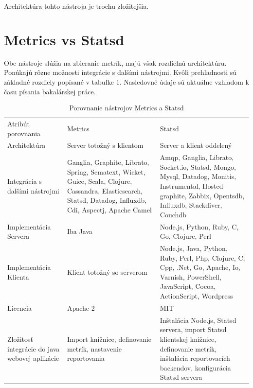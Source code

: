 \documentclass[a4paper, upjsfrontpage, thesismargins, thesislinespacing]{rnthesis}
\begin{document}
Architektúra tohto nástroja je trochu zložitejšia.


\section{Metrics vs Statsd}

Obe nástroje slúžia na zbieranie metrík, majú však rozdielnú architektúru. 
Ponúkajú rôzne možnosti integrácie s ďalšími nástrojmi. 
Kvôli prehľadnosti sú základné rozdiely popísané v tabuľke 1.
Nasledovné údaje sú aktuálne vzhľadom k času písania bakalárskej práce.

\begin{table}
	\caption{Porovnanie nástrojov Metrics a Statsd}
	\centering
	\begin{tabular}{| p{3.7cm} | p{4.5cm} | p{4.7cm} |}
		\hline\noalign{\smallskip}
		Atribút porovnania & Metrics & Statsd \\
		\noalign{\smallskip}
		\hline
		Architektúra & Server totožný s klientom & Server a klient oddelený \\ \hline

		Integrácia s ďalšími nástrojmi & Ganglia, Graphite, Librato, Spring, Sematext, Wicket, Guice, Scala, Clojure, Cassandra, 	Elasticsearch, Statsd, Datadog, Influxdb, Cdi, Aspectj, Apache Camel & Amqp, Ganglia, Librato, Socket.io, Statsd, Mongo, Mysql, Datadog, Monitis, Instrumental, Hosted graphite, Zabbix, Opentsdb, Influxdb, Stackdiver, Couchdb \\ \hline

		Implementácia Servera & Iba Java & Node.js, Python, Ruby, C, Go, Clojure, 	Perl \\ \hline

		Implementácia Klienta & Klient totožný so serverom & Node.js, Java, Python, Ruby, Perl, Php, Clojure, C, Cpp, .Net, Go, 	Apache, Io, Varnish, PowerShell, JavaScript, Cocoa, ActionScript, Wordpress \\ \hline

		Licencia & Apache 2 & MIT \\ \hline

		Zložitosť integrácie do java webovej aplikácie & Import knižnice, definovanie metrík, nastavenie reportovania & Inštalácia Node.js, Statsd servera, import Statsd klientskej knižnice, definovanie metrík, inštalácia reportovacích backendov, konfigurácia Statsd servera \\ \hline


\end{tabular}
\end{table}
\end{document}
